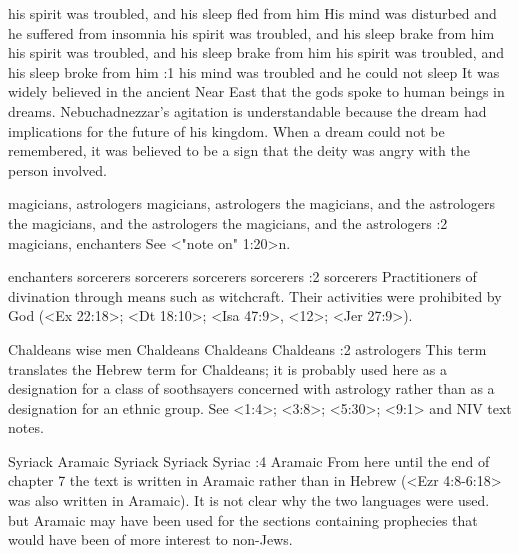     {his spirit was troubled, and his sleep fled from him} %
    {His mind was disturbed and he suffered from insomnia} %
    {his spirit was troubled, and his sleep brake from him} %
    {his spirit was troubled, and his sleep brake from him} %
    {his spirit was troubled, and his sleep broke from him} %
:1 {his mind was troubled and he could not sleep} It was widely believed in the 
ancient Near East that the gods spoke to human beings in dreams. 
Nebuchadnezzar's agitation is understandable because the dream 
had implications for the future of his kingdom. When a dream 
could not be remembered, it was believed to be a sign that the deity was angry with the person
involved.

    {magicians, astrologers} %
    {magicians,   astrologers} %
    {the magicians, and the astrologers} %
    {the magicians, and the astrologers} %
    {the magicians, and the astrologers} %
:2 {magicians, enchanters} See <"note on" 1:20>n.



    {enchanters} %
    {sorcerers} %
    {sorcerers} %
    {sorcerers} %
    {sorcerers} %
:2 {sorcerers} Practitioners of divination through means
such as witchcraft. Their activities were prohibited by God (<Ex 22:18>; <Dt 18:10>; <Isa 47:9>,
<12>; <Jer 27:9>).

    {Chaldeans} %
    {wise men} %
    {Chaldeans} %
    {Chaldeans} %
    {Chaldeans} %
:2 {astrologers} This term translates the Hebrew term for 
Chaldeans; it is probably used here as a designation for a class of 
soothsayers concerned with astrology rather than as a designation 
for an ethnic group. See <1:4>; <3:8>; <5:30>; <9:1>
and NIV text notes.

    {Syriack} %
    {Aramaic} %
    {Syriack} %
    {Syriack} %
    {Syriac} %
:4 {Aramaic} From here until the end of chapter 7 the text is written in Aramaic rather than in
Hebrew (<Ezr 4:8-6:18> was also written in Aramaic). It is not clear why the two languages were used. 
but Aramaic may have been used for the sections containing 
prophecies that would have been of more interest to non-Jews.

